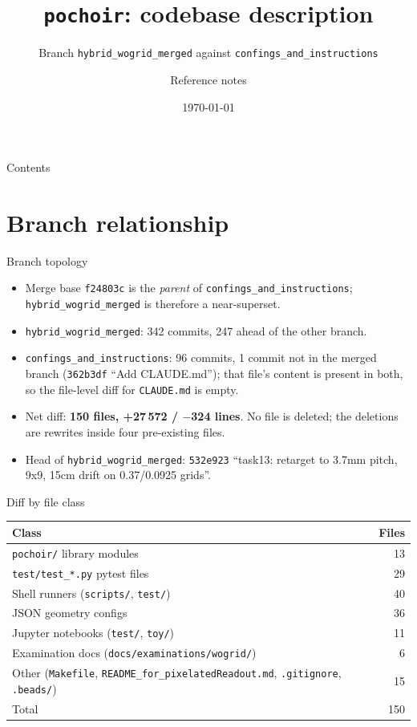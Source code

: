 \documentclass[10pt,aspectratio=169]{beamer}
\title{\texttt{pochoir}: codebase description}
\subtitle{Branch \texttt{hybrid\_wogrid\_merged} against \texttt{confings\_and\_instructions}}
\author{Reference notes}
\date{\today}
\newcommand{\ti}[1]{\texttt{\footnotesize #1}}
\begin{document}
\begin{frame}[plain]
  \titlepage
\end{frame}

\begin{frame}{Contents}
  \small
  \tableofcontents
\end{frame}

\section{Branch relationship}

\begin{frame}{Branch topology}
  \begin{itemize}\small
  \item Merge base \ti{f24803c} is the \emph{parent} of \ti{confings\_and\_instructions};
        \ti{hybrid\_wogrid\_merged} is therefore a near-superset.
  \item \ti{hybrid\_wogrid\_merged}: 342 commits, 247 ahead of the other branch.
  \item \ti{confings\_and\_instructions}: 96 commits, 1 commit not in the merged branch
        (\ti{362b3df} ``Add CLAUDE.md''); that file's content is present in both, so the
        file-level diff for \ti{CLAUDE.md} is empty.
  \item Net diff: \textbf{150 files, +27\,572 / $-$324 lines}. No file is deleted; the
        deletions are rewrites inside four pre-existing files.
  \item Head of \ti{hybrid\_wogrid\_merged}: \ti{532e923} ``task13: retarget to 3.7mm pitch,
        9x9, 15cm drift on 0.37/0.0925 grids''.
  \end{itemize}
\end{frame}

\begin{frame}{Diff by file class}
  \small
  \begin{center}
  \begin{tabular}{lr}
    \toprule
    Class & Files \\
    \midrule
    \ti{pochoir/} library modules & 13 \\
    \ti{test/test\_*.py} pytest files & 29 \\
    Shell runners (\ti{scripts/}, \ti{test/}) & 40 \\
    JSON geometry configs & 36 \\
    Jupyter notebooks (\ti{test/}, \ti{toy/}) & 11 \\
    Examination docs (\ti{docs/examinations/wogrid/}) & 6 \\
    Other (\ti{Makefile}, \ti{README\_for\_pixelatedReadout.md}, \ti{.gitignore}, \ti{.beads/}) & 15 \\
    \midrule
    Total & 150 \\
    \bottomrule
  \end{tabular}
  \end{center}
\end{frame}
\end{document}

